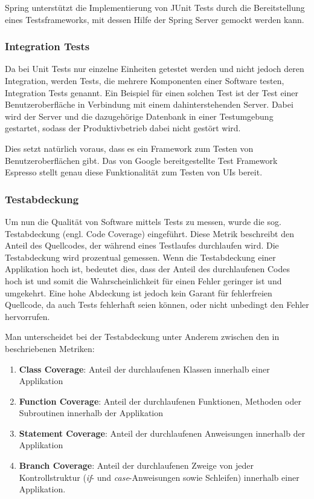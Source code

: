 				Spring unterstützt die Implementierung von JUnit Tests durch die Bereitstellung eines Testsframeworks, mit dessen Hilfe der Spring Server gemockt werden kann. 
				
			\subsubsection{Integration Tests}
			\label{qm.integration_tests}
			
				Da bei Unit Tests nur einzelne Einheiten getestet werden und nicht jedoch deren Integration, werden Tests, die mehrere Komponenten einer Software testen, Integration Tests genannt. Ein Beispiel für einen solchen Test ist der Test einer Benutzeroberfläche in Verbindung mit einem dahinterstehenden Server. Dabei wird der Server und die dazugehörige Datenbank in einer Testumgebung gestartet, sodass der Produktivbetrieb dabei nicht gestört wird. 
				
				Dies setzt natürlich voraus, dass es ein Framework zum Testen von Benutzeroberflächen gibt. Das von Google bereitgestellte Test Framework Espresso stellt genau diese Funktionalität zum Testen von \acs{UI}s bereit. 
			
			\subsubsection{Testabdeckung}
			\label{qm.tests.testabdeckung}
			
				Um nun die Qualität von Software mittels Tests zu messen, wurde die sog. Testabdeckung (engl. Code Coverage) eingeführt. Diese Metrik beschreibt den Anteil des Quellcodes, der während eines Testlaufes durchlaufen wird. Die Testabdeckung wird prozentual gemessen. Wenn die Testabdeckung einer Applikation hoch ist, bedeutet dies, dass der Anteil des durchlaufenen Codes hoch ist und somit die Wahrscheinlichkeit für einen Fehler geringer ist und umgekehrt. Eine hohe Abdeckung ist jedoch kein Garant für fehlerfreien Quellcode, da auch Tests fehlerhaft seien können, oder nicht unbedingt den Fehler hervorrufen. \cite{MartinFowler.2292020b}
				
				Man unterscheidet bei der Testabdeckung unter Anderem zwischen den in \cite{Myers.2004} beschriebenen Metriken:
				
				\begin{enumerate}
					\item 
						\textbf{Class Coverage}: Anteil der durchlaufenen Klassen innerhalb einer Applikation
					\item 	
						\textbf{Function Coverage}: Anteil der durchlaufenen Funktionen, Methoden oder Subroutinen innerhalb der Applikation
					\item 
						\textbf{Statement Coverage}: Anteil der durchlaufenen Anweisungen innerhalb der Applikation
					\item 
						\textbf{Branch Coverage}: Anteil der durchlaufenen Zweige von jeder Kontrollstruktur (\textit{if}- und \textit{case}-Anweisungen sowie Schleifen) innerhalb einer Applikation. 
				\end{enumerate}
			
